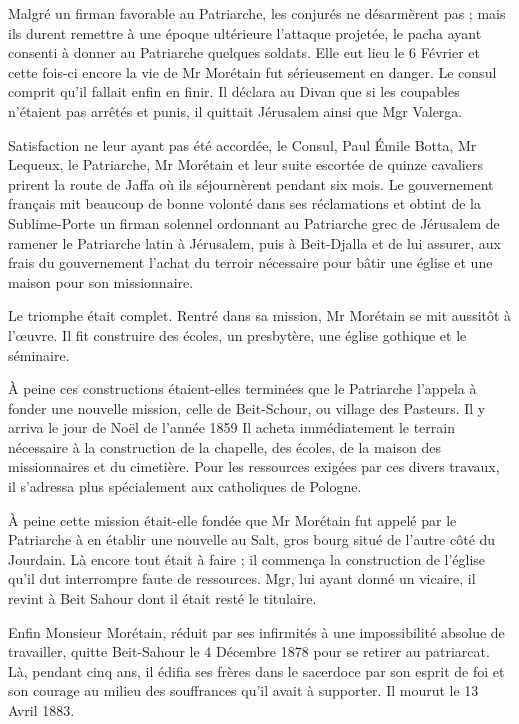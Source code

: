 Malgré un firman favorable au Patriarche, les conjurés ne désarmèrent pas ; mais ils durent remettre à une époque ultérieure l'attaque projetée, le pacha ayant consenti à donner au Patriarche quelques soldats. Elle eut lieu le 6 Février et cette fois-ci encore la vie de Mr Morétain fut sérieusement en danger. Le consul comprit qu'il fallait enfin en finir. Il déclara au Divan que si les coupables n'étaient pas arrêtés et punis, il quittait Jérusalem ainsi que Mgr Valerga.

Satisfaction ne leur ayant pas été accordée, le Consul, Paul Émile Botta, Mr Lequeux, le Patriarche, Mr Morétain et leur suite escortée de quinze cavaliers prirent la route de Jaffa où ils séjournèrent pendant six mois. Le gouvernement français mit beaucoup de bonne volonté dans ses réclamations et obtint de la Sublime-Porte un firman solennel ordonnant au Patriarche grec de Jérusalem de ramener le Patriarche latin à Jérusalem, puis à Beit-Djalla et de lui assurer, aux frais du gouvernement l'achat du terroir nécessaire pour bâtir une église et une maison pour son missionnaire.

Le triomphe était complet. Rentré dans sa mission, Mr Morétain se mit aussitôt à l'œuvre. Il fit construire des écoles, un presbytère, une église gothique et le séminaire.

À peine ces constructions étaient-elles terminées que le Patriarche l'appela à fonder une nouvelle mission, celle de Beit-Schour, ou village des Pasteurs. Il y arriva le jour de Noël de l'année 1859 Il acheta immédiatement le terrain nécessaire à la construction de la chapelle, des écoles, de la maison des missionnaires et du cimetière. Pour les ressources exigées par ces divers travaux, il s'adressa plus spécialement aux catholiques de Pologne.

À peine cette mission était-elle fondée que Mr Morétain fut appelé par le Patriarche à en établir une nouvelle au Salt, gros bourg situé de l'autre côté du Jourdain. Là encore tout était à faire ; il commença la construction de l'église qu'il dut interrompre faute de ressources. Mgr, lui ayant donné un vicaire, il revint à Beit Sahour dont il était resté le titulaire.

Enfin Monsieur Morétain, réduit par ses infirmités à une impossibilité absolue de travailler, quitte Beit-Sahour le 4 Décembre 1878 pour se retirer au patriarcat. Là, pendant cinq ans, il édifia ses frères dans le sacerdoce par son esprit de foi et son courage au milieu des souffrances qu'il avait à supporter. Il mourut le 13 Avril 1883.

